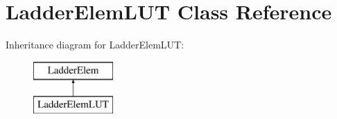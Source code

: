 \hypertarget{class_ladder_elem_l_u_t}{\section{Ladder\-Elem\-L\-U\-T Class Reference}
\label{class_ladder_elem_l_u_t}
}
Inheritance diagram for Ladder\-Elem\-L\-U\-T\-:\begin{figure}[H]
\begin{center}
\leavevmode
\includegraphics[height=2.000000cm]{class_ladder_elem_l_u_t}
\end{center}
\end{figure}
